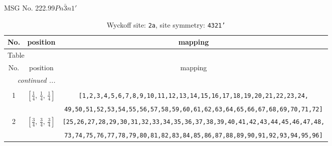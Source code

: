 \documentclass[fleqn,8pt]{jsarticle}
\begin{document}
\setcounter{MaxMatrixCols}{32}

\renewcommand{\tablename}{Table~}
\renewcommand{\figurename}{Figure~}
\begin{center}
\LARGE
MSG No. 222.99\quad$Pn\bar{3}n1'$
\end{center}
\renewcommand{\arraystretch}{1.2}
\begin{longtable}{ccc}
\caption{Wyckoff site: {\tt 2a}, site symmetry: {\tt 4321'}}
 \\
 \hline \hline
No. & position & mapping \\ \hline \endfirsthead

\multicolumn{2}{l}{\tablename\ \thetable{}} \\
 \hline \hline
No. & position & mapping \\ \hline \endhead

 \hline \hline
\multicolumn{2}{r}{\footnotesize\it continued ...} \\ \endfoot

 \hline \hline
\multicolumn{2}{r}{} \\ \endlastfoot

1 & $\left[ \frac{1}{4},\, \frac{1}{4},\, \frac{1}{4} \right]$ & {\tt [1,2,3,4,5,6,7,8,9,10,11,12,13,14,15,16,17,18,19,20,21,22,23,24,} \\ \hline
 &  & {\tt 49,50,51,52,53,54,55,56,57,58,59,60,61,62,63,64,65,66,67,68,69,70,71,72]} \\ \hline
2 & $\left[ \frac{3}{4},\, \frac{3}{4},\, \frac{3}{4} \right]$ & {\tt [25,26,27,28,29,30,31,32,33,34,35,36,37,38,39,40,41,42,43,44,45,46,47,48,} \\ \hline
 &  & {\tt 73,74,75,76,77,78,79,80,81,82,83,84,85,86,87,88,89,90,91,92,93,94,95,96]} \\
\end{longtable}
\renewcommand{\arraystretch}{1.2}
\end{document}
